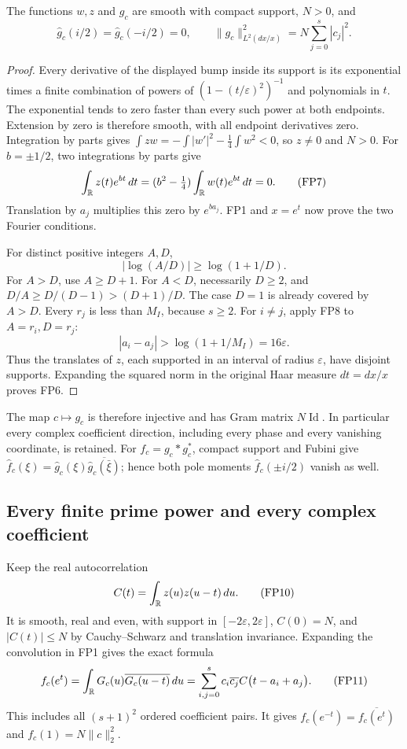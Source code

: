 \begin{lemma}
\label{fp:lem:admissible}
The functions \(w,z\) and \(g_c\) are smooth with compact support,
\(N>0\), and
\[
 \widehat g_c(i/2)=\widehat g_c(-i/2)=0,\qquad
 \|g_c\|_{L^2(dx/x)}^2=N\sum_{j=0}^s|c_j|^2 .
 \tag{FP6}\label{fp:fpb:norm}
\]
\end{lemma}
\begin{proof}
Every derivative of the displayed bump inside its support is its
exponential times a finite combination of powers of
\((1-(t/\varepsilon)^2)^{-1}\) and polynomials in \(t\). The exponential
tends to zero faster than every such power at both endpoints.
Extension by zero is therefore smooth, with all endpoint
derivatives zero. Integration by parts gives
\(\int zw=-\int|w'|^2-\tfrac14\int w^2<0\), so \(z\ne0\) and \(N>0\).
For \(b=\pm1/2\), two integrations by parts give
\[
 \int_{\mathbb R}z(t)e^{bt}\,dt
   =(b^2-\tfrac14)\int_{\mathbb R}w(t)e^{bt}\,dt=0.
 \tag{FP7}
\]
Translation by \(a_j\) multiplies this zero by \(e^{ba_j}\).
FP1 and \(x=e^t\) now prove the two Fourier conditions.

For distinct positive integers \(A,D\),
\[
 |\log(A/D)|\ge\log(1+1/D).
 \tag{FP8}\label{fp:fpb:integer-gap}
\]
For \(A>D\), use \(A\ge D+1\). For \(A<D\), necessarily \(D\ge2\),
and \(D/A\ge D/(D-1)>(D+1)/D\). The case \(D=1\) is already
covered by \(A>D\).
Every \(r_j\) is less than \(M_I\), because \(s\ge2\).
For \(i\ne j\), apply FP8 to \(A=r_i,D=r_j\):
\[
 |a_i-a_j|>\log(1+1/M_I)=16\varepsilon.
 \tag{FP9}\label{fp:fpb:centre-gap}
\]
Thus the translates of \(z\), each supported in an interval of
radius \(\varepsilon\), have disjoint supports. Expanding the squared
norm in the original Haar measure \(dt=dx/x\) proves FP6.
\end{proof}

The map \(c\mapsto g_c\) is therefore injective and has Gram
matrix \(N\operatorname{Id}\). In particular every complex coefficient direction,
including every phase and every vanishing coordinate, is retained.
For \(f_c=g_c*g_c^*\), compact support and Fubini give
\(\widehat f_c(\xi)=\widehat g_c(\xi)
\overline{\widehat g_c(\bar\xi)}\); hence both pole moments
\(\widehat f_c(\pm i/2)\) vanish as well.

\subsection{Every finite prime power and every complex coefficient}

Keep the real autocorrelation
\[
 C(t)=\int_{\mathbb R}z(u)z(u-t)\,du.
 \tag{FP10}\label{fp:fpb:C}
\]
It is smooth, real and even, with support in
\([-2\varepsilon,2\varepsilon]\), \(C(0)=N\), and \(|C(t)|\le N\) by
Cauchy--Schwarz and translation invariance.
Expanding the convolution in FP1 gives the exact formula
\[
 f_c(e^t)=\int_{\mathbb R}G_c(u)\overline{G_c(u-t)}\,du
   =\sum_{i,j=0}^s c_i\overline{c_j}
                  C\bigl(t-a_i+a_j\bigr).
 \tag{FP11}\label{fp:fpb:convolution}
\]
This includes all \((s+1)^2\) ordered coefficient pairs. It gives
\(f_c(e^{-t})=\overline{f_c(e^t)}\) and
\(f_c(1)=N\|c\|_2^2\).

